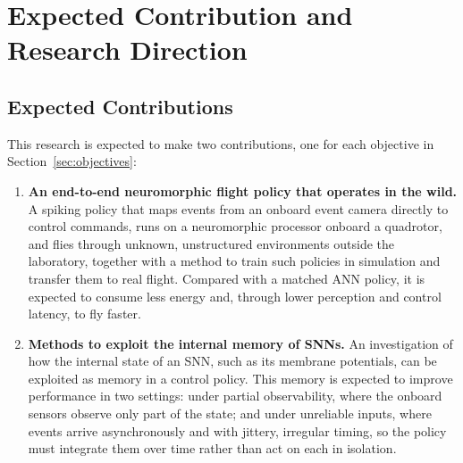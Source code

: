 \section{Expected Contribution and Research Direction}
\label{sec:contribution}

\subsection{Expected Contributions}
This research is expected to make two contributions, one for each objective in Section~\ref{sec:objectives}:
\begin{enumerate}
    \item \textbf{An end-to-end neuromorphic flight policy that operates in the wild.} A spiking policy that maps events from an onboard event camera directly to control commands, runs on a neuromorphic processor onboard a quadrotor, and flies through unknown, unstructured environments outside the laboratory, together with a method to train such policies in simulation and transfer them to real flight. Compared with a matched ANN policy, it is expected to consume less energy and, through lower perception and control latency, to fly faster.
    \item \textbf{Methods to exploit the internal memory of SNNs.} An investigation of how the internal state of an SNN, such as its membrane potentials, can be exploited as memory in a control policy. This memory is expected to improve performance in two settings: under partial observability, where the onboard sensors observe only part of the state; and under unreliable inputs, where events arrive asynchronously and with jittery, irregular timing, so the policy must integrate them over time rather than act on each in isolation.
\end{enumerate}

